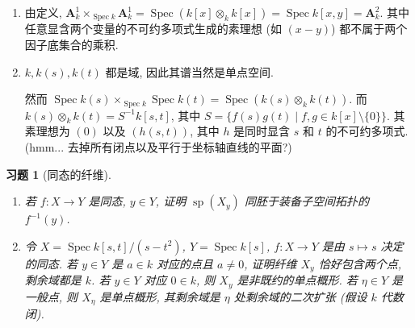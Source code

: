 \documentclass{article}
\theoremstyle{exercise}
\newtheorem{exercise}{习题}[section]
\newenvironment{proofc}{\proof}{\endproof}
\def\A{\mathbf{A}}
\def\spp{\operatorname{sp}}
\def\Spec{\operatorname{Spec}}
\begin{document}
\begin{proofc}
  \begin{enumerate}[label={(\alph*)}]
    \item 由定义, $\A_k^1 \times_{\Spec k} \A_k^1 = \Spec (k[x] \otimes_k k[x]) = \Spec k[x, y] = \A_k^2$.
          其中任意显含两个变量的不可约多项式生成的素理想
          (如 $(x - y)$) 都不属于两个因子底集合的乘积.
    \item $k, k(s), k(t)$ 都是域, 因此其谱当然是单点空间.

          然而 $\Spec k(s) \times_{\Spec k} \Spec k(t) = \Spec (k(s) \otimes_k k(t))$.
          而 $k(s) \otimes_k k(t) = S^{-1} k[s, t]$,
          其中 $S = \{ f(s) g(t) \mid f, g \in k[x] \setminus \{ 0 \} \}$.
          其素理想为 $(0)$ 以及 $(h(s, t))$, 其中 $h$ 是同时显含 $s$ 和 $t$ 的不可约多项式.
          (hmm... 去掉所有闭点以及平行于坐标轴直线的平面?)
          \qedhere
  \end{enumerate}
\end{proofc}

\begin{exercise}[同态的纤维]
  \begin{enumerate}[label={(\alph*)}]
    \item 若 $f \colon X \to Y$ 是同态, $y \in Y$,
          证明 $\spp(X_y)$ 同胚于装备子空间拓扑的 $f^{-1}(y)$.
    \item 令 $X = \Spec k[s, t] / (s - t^2)$, $Y = \Spec k[s]$,
          $f \colon X \to Y$ 是由 $s \mapsto s$ 决定的同态.
          若 $y \in Y$ 是 $a \in k$ 对应的点且 $a \neq 0$,
          证明纤维 $X_y$ 恰好包含两个点, 剩余域都是 $k$.
          若 $y \in Y$ 对应 $0 \in k$, 则 $X_y$ 是非既约的单点概形.
          若 $\eta \in Y$ 是一般点, 则 $X_{\eta}$ 是单点概形,
          其剩余域是 $\eta$ 处剩余域的二次扩张 (假设 $k$ 代数闭).
  \end{enumerate}
\end{exercise}
\end{document}
